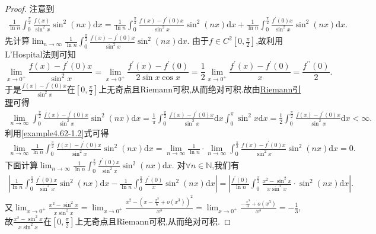 \documentclass[../../main.tex]{subfiles}%
\begin{document}
\begin{proof}
注意到
\begin{align}\label{example4.62-1.1}
\frac{1}{\ln n}\int_0^{\frac{\pi}{2}}{\frac{f(x)}{\sin^2x}\sin^2(nx)\mathrm{d}x}=\frac{1}{\ln n}\int_0^{\frac{\pi}{2}}{\frac{f(x) - f^\prime(0)x}{\sin^2x}\sin^2(nx)\mathrm{d}x}+\frac{1}{\ln n}\int_0^{\frac{\pi}{2}}{\frac{f^\prime(0)x}{\sin^2x}\sin^2(nx)\mathrm{d}x}. 
\end{align}
先计算\(\lim_{n\rightarrow \infty} \frac{1}{\ln n}\int_0^{\frac{\pi}{2}}{\frac{f(x) - f^\prime(0)x}{\sin^2x}\sin^2(nx)\mathrm{d}x}\).
由于\(f\in C^2\left[0, \frac{\pi}{2}\right]\),故利用L'Hospital法则可知
\[
\lim_{x\rightarrow 0^+} \frac{f(x) - f^\prime(0)x}{\sin^2x}=\lim_{x\rightarrow 0^+} \frac{f^\prime(x) - f^\prime(0)}{2\sin x\cos x}=\frac{1}{2}\lim_{x\rightarrow 0^+} \frac{f^\prime(x) - f^\prime(0)}{x}=\frac{f^{\prime\prime}(0)}{2}.
\]
于是\(\frac{f(x) - f^\prime(0)x}{\sin^2x}\)在\(\left[0, \frac{\pi}{2}\right]\)上无奇点且Riemann可积,从而绝对可积.故由\hyperref[theorem:Riemann引理]{Riemann引理}可得
\begin{align}
\lim_{n\rightarrow \infty} \int_0^{\frac{\pi}{2}}{\frac{f(x) - f^\prime(0)x}{\sin^2x}\sin^2(nx)\mathrm{d}x}=\frac{1}{\pi}\int_0^{\frac{\pi}{2}}{\frac{f(x) - f^\prime(0)x}{\sin^2x}\mathrm{d}x}\int_0^{\pi}{\sin^2x\mathrm{d}x}
= \frac{1}{2}\int_0^{\frac{\pi}{2}}{\frac{f(x) - f^\prime(0)x}{\sin^2x}\mathrm{d}x}<\infty. \label{example4.62-1.2}
\end{align}
利用\eqref{example4.62-1.2}式可得
\begin{align}\label{example4.62-1.3}
\lim_{n\rightarrow \infty} \frac{1}{\ln n}\int_0^{\frac{\pi}{2}}{\frac{f(x) - f^\prime(0)x}{\sin^2x}\sin^2(nx)\mathrm{d}x}=\lim_{n\rightarrow \infty} \frac{1}{\ln n}\cdot \lim_{n\rightarrow \infty} \int_0^{\frac{\pi}{2}}{\frac{f(x) - f^\prime(0)x}{\sin^2x}\sin^2(nx)\mathrm{d}x}=0.  
\end{align}
下面计算\(\lim_{n\rightarrow \infty} \frac{1}{\ln n}\int_0^{\frac{\pi}{2}}{\frac{f^\prime(0)x}{\sin^2x}\sin^2(nx)\mathrm{d}x}\).
对\(\forall n\in \mathbb{N}\),我们有
\begin{align}\label{example4.62-1.4}
\left|\frac{1}{\ln n}\int_0^{\frac{\pi}{2}}{\frac{f^\prime(0)x}{\sin^2x}\sin^2(nx)\mathrm{d}x}-\frac{1}{\ln n}\int_0^{\frac{\pi}{2}}{\frac{f^\prime(0)}{x}\sin^2(nx)\mathrm{d}x}\right|=\left|\frac{f^\prime(0)}{\ln n}\int_0^{\frac{\pi}{2}}{\frac{x^2 - \sin^2x}{x\sin^2x}\cdot \sin^2(nx)\mathrm{d}x}\right|.
\end{align}
又\(\lim_{x\rightarrow 0^+} \frac{x^2 - \sin^2x}{x\sin^2x}=\lim_{x\rightarrow 0^+} \frac{x^2 - \left(x - \frac{x^3}{6} + o(x^3)\right)^2}{x^3}=\lim_{x\rightarrow 0^+} \frac{-\frac{x^3}{3} + o(x^3)}{x^3}=-\frac{1}{3}\),故\(\frac{x^2 - \sin^2x}{x\sin^2x}\)在\(\left[0, \frac{\pi}{2}\right]\)上无奇点且Riemann可积,从而绝对可积.

\end{proof}
\end{document}
